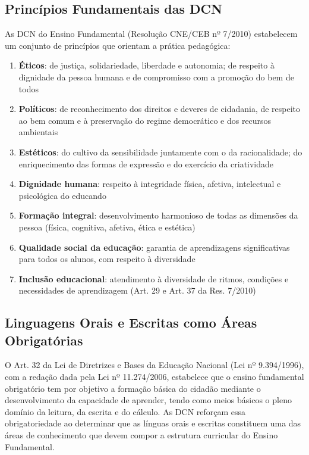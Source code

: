 \subsection{Princípios Fundamentais das DCN}

As DCN do Ensino Fundamental (Resolução CNE/CEB nº 7/2010) estabelecem um conjunto de princípios que orientam a prática pedagógica:

\begin{enumerate}[leftmargin=2cm]
  \item \textbf{Éticos}: de justiça, solidariedade, liberdade e autonomia; de respeito à dignidade da pessoa humana e de compromisso com a promoção do bem de todos
  \item \textbf{Políticos}: de reconhecimento dos direitos e deveres de cidadania, de respeito ao bem comum e à preservação do regime democrático e dos recursos ambientais
  \item \textbf{Estéticos}: do cultivo da sensibilidade juntamente com o da racionalidade; do enriquecimento das formas de expressão e do exercício da criatividade
  \item \textbf{Dignidade humana}: respeito à integridade física, afetiva, intelectual e psicológica do educando
  \item \textbf{Formação integral}: desenvolvimento harmonioso de todas as dimensões da pessoa (física, cognitiva, afetiva, ética e estética)
  \item \textbf{Qualidade social da educação}: garantia de aprendizagens significativas para todos os alunos, com respeito à diversidade
  \item \textbf{Inclusão educacional}: atendimento à diversidade de ritmos, condições e necessidades de aprendizagem (Art. 29 e Art. 37 da Res. 7/2010)
\end{enumerate}

\subsection{Linguagens Orais e Escritas como Áreas Obrigatórias}

O Art. 32 da Lei de Diretrizes e Bases da Educação Nacional (Lei nº 9.394/1996), com a redação dada pela Lei nº 11.274/2006, estabelece que o ensino fundamental obrigatório tem por objetivo a formação básica do cidadão mediante o desenvolvimento da capacidade de aprender, tendo como meios básicos o pleno domínio da leitura, da escrita e do cálculo. As DCN reforçam essa obrigatoriedade ao determinar que as línguas orais e escritas constituem uma das áreas de conhecimento que devem compor a estrutura curricular do Ensino Fundamental.

